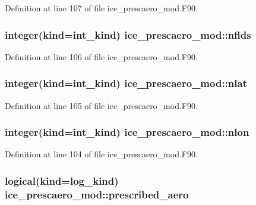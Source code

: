 Definition at line 107 of file ice\_\-prescaero\_\-mod.F90.\hypertarget{namespaceice__prescaero__mod_ab653a95f175ec939e8476b301828c31e}{
\subsubsection[{nflds}]{\setlength{\rightskip}{0pt plus 5cm}integer(kind=int\_\-kind) {\bf ice\_\-prescaero\_\-mod::nflds}}}
\label{namespaceice__prescaero__mod_ab653a95f175ec939e8476b301828c31e}


Definition at line 106 of file ice\_\-prescaero\_\-mod.F90.\hypertarget{namespaceice__prescaero__mod_a7b9a21f0e090fc79f73045a9e324d08f}{
\subsubsection[{nlat}]{\setlength{\rightskip}{0pt plus 5cm}integer(kind=int\_\-kind) {\bf ice\_\-prescaero\_\-mod::nlat}}}
\label{namespaceice__prescaero__mod_a7b9a21f0e090fc79f73045a9e324d08f}


Definition at line 105 of file ice\_\-prescaero\_\-mod.F90.\hypertarget{namespaceice__prescaero__mod_a06c7ca3e93cd15535e2ed6f3cd5bf314}{
\subsubsection[{nlon}]{\setlength{\rightskip}{0pt plus 5cm}integer(kind=int\_\-kind) {\bf ice\_\-prescaero\_\-mod::nlon}}}
\label{namespaceice__prescaero__mod_a06c7ca3e93cd15535e2ed6f3cd5bf314}


Definition at line 104 of file ice\_\-prescaero\_\-mod.F90.\hypertarget{namespaceice__prescaero__mod_a12fbaeed0ee95a72e9c96406be9d7578}{
\subsubsection[{prescribed\_\-aero}]{\setlength{\rightskip}{0pt plus 5cm}logical(kind=log\_\-kind) {\bf ice\_\-prescaero\_\-mod::prescribed\_\-aero}}}
\label{namespaceice__prescaero__mod_a12fbaeed0ee95a72e9c96406be9d7578}


